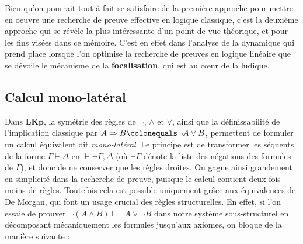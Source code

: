 \documentclass[12pt]{report}
\newcommand{\lto}{\Rightarrow}
\newcommand{\seq}{\vdash}
\newtheorem{definition}{Définition}
\begin{document}
Bien qu'on pourrait tout à fait se satisfaire de la première approche pour mettre en oeuvre une recherche de preuve effective en logique classique, c'est la deuxième approche qui se révèle la plus intéressante d'un point de vue théorique, et pour les fins visées dans ce mémoire. C'est en effet dans l'analyse de la dynamique qui prend place lorsque l'on optimise la recherche de preuves en logique linéaire que se dévoile le mécanisme de la \textbf{focalisation}, qui est au cœur de la ludique.

\subsection{Calcul mono-latéral}



Dans $\mathbf{LKp}$, la symétrie des règles de $\neg$, $\land$ et $\lor$, ainsi que la définissabilité de l'implication classique par $A \lto B \colonequals \neg A \lor B$, permettent de formuler un calcul équivalent dit \emph{mono-latéral}. Le principe est de transformer les séquents de la forme $\Gamma \seq \Delta$ en $\seq \neg \Gamma,\Delta$ (où $\neg \Gamma$ dénote la liste des négations des formules de $\Gamma$), et donc de ne conserver que les règles droites. On gagne ainsi grandement en simplicité dans la recherche de preuve, puisque le calcul contient deux fois moins de règles. Toutefois cela est possible uniquement grâce aux équivalences de De Morgan, qui font un usage crucial des règles structurelles. En effet, si l'on essaie de prouver $\neg (A \land B) \seq \neg A \lor \neg B$ dans notre système sous-structurel en décomposant mécaniquement les formules jusqu'aux axiomes, on bloque de la manière suivante :
\end{document}
